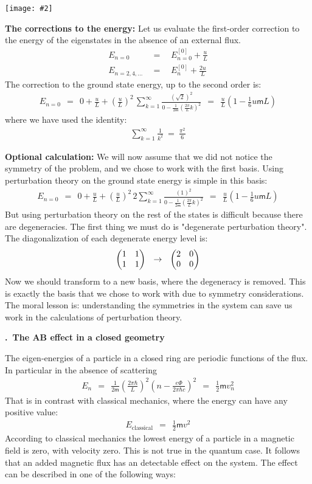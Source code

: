 \documentclass[onecolumn,fleqn, 11pt]{revtex4}
\newcommand{\mass}{\mathsf{m}}
\newcommand{\amatrix}[1]{\begin{matrix} #1 \end{matrix}}
\newcommand{\putgraph}[2][0.30\hsize]{\texttt{[image: \#2]}}
\newcommand{\beq}{\begin{eqnarray}}
\newcommand{\eeq}{\end{eqnarray}}
\renewcommand{\thesubsection}{\arabic{subsection}}
\renewcommand{\thesubsubsection}{\arabic{subsubsection}}
\newcommand{\sheadC}[1]
{
\addtocounter{subsubsection}{1}
\vspace{5mm}
{\bf \thesubsection.\thesubsubsection \ #1}  
\nopagebreak
\phantomsection
}
\begin{document}
\begin{center}
\putgraph[0.4\hsize]{boxlevels} 
\end{center}

 



{\bf The corrections to the energy:} 
Let us evaluate the first-order correction to the energy 
of the eigenstates in the absence of an external flux.
\beq
E_{n{=}0} \ \ &=& \ \ E_{n{=}0}^{[0]} + \frac{u}{L}
\\ \nonumber
E_{n{=}2,4,\dots} \ \ &=& \ \ E_n^{[0]} + \frac{2u}{L} 
\eeq
The correction to the ground state 
energy, up to the second order is:
\beq
E_{n{=}0} \ \ = \ \ 0 + \frac{u}{L} + \left(\frac{u}{L}\right)^2 \, 
\sum_{k=1}^{\infty}
\frac{(\sqrt{2})^2} {0-\frac{1}{2\mass}
\left(\frac{2\pi}{L}k\right)^2} 
\ \ = \ \ 
\frac{u}{L}\left (1-\frac{1}{6}u \mass L \right) 
\eeq
where we have used the identity:
\beq
\sum_{k=1}^{\infty}\frac{1}{k^2} \ = \ \frac{\pi^2}{6} 
\eeq




{\bf Optional calculation:} 
We will now assume that we did not notice the 
symmetry of the problem, and we chose to work with 
the first basis. Using perturbation theory 
on the ground state energy is simple in this basis:
\beq
E_{n{=}0} \ \ = \ \ 0 + \frac{u}{L} + \left(\frac{u}{L}\right)^2 \, 
2\sum_{k=1}^{\infty}\frac{(1)^2} {0-\frac{1}{2\mass}\left(\frac{2\pi}{L}k\right)^2} 
\ \ = \ \ 
\frac{u}{L}\left (1-\frac{1}{6}u \mass L \right) 
\eeq
But using perturbation theory on the rest of 
the states is difficult because there are degeneracies. 
The first thing we must do is "degenerate perturbation theory". 
The diagonalization of each degenerate energy level is:
\beq
\left(\amatrix{1 & 1 \cr 1 & 1 } \right) \ \  \rightarrow \ \ \left(\amatrix{2 & 0 \cr 0 & 0 } \right) 
\eeq
Now we should transform to a new basis, where the 
degeneracy is removed. This is exactly the 
basis that we chose to work with due to symmetry 
considerations. The moral lesson is: understanding the 
symmetries in the system can save us work in the 
calculations of perturbation theory. 



\sheadC{The AB effect in a closed geometry}

The eigen-energies of a particle in a closed ring 
are periodic functions of the flux.
In particular in the absence of scattering   
\beq
E_n \ \ = \ \ \frac {1}{2\mass} 
\left( \frac {2 \pi\hbar}{L} \right)^2 
\left( n- \frac {e\Phi}{2\pi\hbar c}\right)^2 
\ \ = \ \ \frac{1}{2}\mass v_n^2 
\eeq
That is in contrast with classical mechanics, 
where the energy can have any positive value:
\beq
E_{\mbox{classical}} \ \ = \ \ \frac {1}{2} \mass v^2 
\eeq
According to classical mechanics the lowest energy 
of a particle in a magnetic field is zero, with velocity zero. 
This is not true in the quantum case. 
It follows that an added magnetic flux has 
an detectable effect on the system. 
The effect can be described in one of the following ways:
\end{document}
